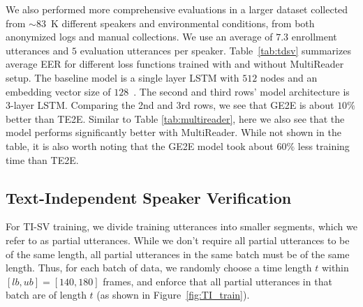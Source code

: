 \documentclass{article}
\begin{document}
We also performed more comprehensive evaluations in a larger dataset collected from $\sim 83$~K different speakers and environmental conditions, from both anonymized logs and manual collections. We use an average of $7.3$ enrollment utterances and $5$ evaluation utterances per speaker.
Table~\ref{tab:tdsv} summarizes average EER for different
loss functions trained with and without MultiReader setup. The baseline model is
a single layer LSTM with $512$ nodes and an embedding vector size of
$128$~\cite{heigold2016end}.
The second and third rows' model architecture is 3-layer LSTM.
Comparing the 2nd and 3rd rows, we see that GE2E is about $10\%$ better than TE2E.
Similar to Table \ref{tab:multireader}, here we also see that the model performs
significantly better with MultiReader. While not shown in the table, it is also
worth noting that the GE2E model took about $60\%$ less training time than TE2E.

\begin{table}[t]
  \caption{Text-dependent speaker verification EER.}
  \label{tab:tdsv}
  \begin{center}
  \end{center}
\end{table}

\subsection{Text-Independent Speaker Verification}
\label{sec:tisid}

For TI-SV training, we divide training utterances into smaller segments, which we
refer to as partial utterances. While we don't require all partial
utterances to be of the same length, all partial utterances in the same batch
must be of the same length. Thus, for each batch of data,
we randomly choose a time length $t$ within $[lb,ub]=[140,180]$ frames,
and enforce that all partial utterances in that batch are of length $t$
(as shown in Figure~\ref{fig:TI_train}).
\end{document}
